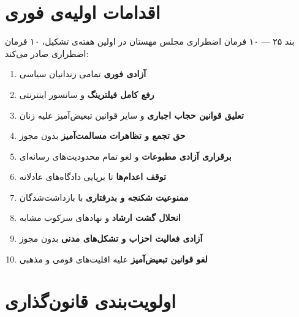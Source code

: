 \documentclass[12pt,a4paper,twoside,openany]{book}
\begin{document}
\begin{center}
{
		}%
	\end{center}
	\vspace{0.5\baselineskip}
	
	\section{اقدامات اولیه‌ی فوری}
	
	\begin{bandbox}{بند ۲۵ --- ۱۰ فرمان اضطراری}
		مجلس مهستان در اولین هفته‌ی تشکیل، ۱۰ فرمان اضطراری صادر می‌کند:
		
		\begin{enumerate}
			\item \textbf{آزادی فوری} تمامی زندانیان سیاسی
			\item \textbf{رفع کامل فیلترینگ} و سانسور اینترنتی
			\item \textbf{تعلیق قوانین حجاب اجباری} و سایر قوانین تبعیض‌آمیز علیه زنان
			\item \textbf{حق تجمع و تظاهرات مسالمت‌آمیز} بدون مجوز
			\item \textbf{برقراری آزادی مطبوعات} و لغو تمام محدودیت‌های رسانه‌ای
			\item \textbf{توقف اعدام‌ها} تا برپایی دادگاه‌های عادلانه
			\item \textbf{ممنوعیت شکنجه و بدرفتاری} با بازداشت‌شدگان
			\item \textbf{انحلال گشت ارشاد} و نهادهای سرکوب مشابه
			\item \textbf{آزادی فعالیت احزاب و تشکل‌های مدنی} بدون مجوز
			\item \textbf{لغو قوانین تبعیض‌آمیز} علیه اقلیت‌های قومی و مذهبی
		\end{enumerate}
	\end{bandbox}
	
	\section{اولویت‌بندی قانون‌گذاری}
	
\end{document}
